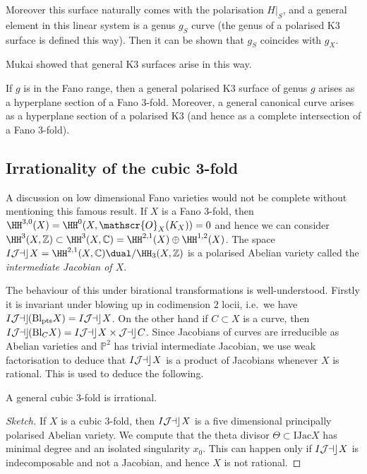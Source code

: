 Moreover this surface naturally comes with the polarisation \(H|_S\), and a general element in this linear system is a genus \(g_S\) curve (the genus of a polarised K3 surface is defined this way). Then it can be shown that \(g_S\) coincides with \(g_X\).

Mukai showed that general K3 surfaces arise in this way.

\begin{theorem}[(Mukai)]
    If \(g\) is in the Fano range, then a general polarised K3 surface of genus
    \(g\) arises as a hyperplane section of a Fano 3-fold. Moreover, a general
    canonical curve arises as a hyperplane section of a polarised K3 (and hence
    as a complete intersection of a Fano 3-fold).
\end{theorem}

\subsection{Irrationality of the cubic 3-fold} A discussion on low dimensional
Fano varieties would not be complete without mentioning this famous result.
If \(X\) is a Fano 3-fold, then \(\HH^{3,0}(X)=\HH^0(X,\mathscr{O}_X(K_X))=0\)
and hence we can consider \(\HH^3(X,\mathbb{Z})\subset
\HH^3(X,\mathbb{C})=\HH^{2,1}(X)\oplus \HH^{1,2}(X)\). The space
\(\IJac X=\HH^{2,1}(X,\mathbb{C})\dual / \HH_3(X,\mathbb{Z})\) is a
polarised Abelian variety called the \textit{intermediate Jacobian of \(X\)}.

The behaviour of this under birational transformations is well-understood.
Firstly it is invariant under blowing up in codimension \(2\) locii, i.e.\ we
have \(\mathop{I\mathcal{J\kern -0.5pt a\kern -0.5pt c\kern -1pt}}(\text{Bl}_{\text{pts}}X)=\mathop{I\mathcal{J\kern -0.5pt a\kern -0.5pt c\kern -1pt}} X\). On the other hand if
\(C\subset X\) is a curve, then \(\mathop{I\mathcal{J\kern -0.5pt a\kern -0.5pt c\kern -1pt}}(\text{Bl}_CX)=\mathop{I\mathcal{J\kern -0.5pt a\kern -0.5pt c\kern -1pt}} X\times
\mathop{\mathcal{J\kern -0.5pt a\kern -0.5pt c\kern -1pt}} C\). Since Jacobians of curves are irreducible as Abelian varieties and
\(\mathbb{P}^2\) has trivial intermediate Jacobian, we use weak factorisation to
deduce that \(\mathop{I\mathcal{J\kern -0.5pt a\kern -0.5pt c\kern -1pt}} X\) is a product of Jacobians whenever \(X\) is rational.
This is used to deduce the following.

\begin{theorem}
    A general cubic 3-fold is irrational.

    \begin{proof}[Sketch]
        If \(X\) is a cubic 3-fold, then \(\mathop{I\mathcal{J\kern -0.5pt a\kern -0.5pt c\kern -1pt}} X\) is a five dimensional
        principally polarised Abelian variety. We compute that the theta divisor
        \(\Theta\subset \text{IJac}X\) has minimal degree and an isolated
        singularity \(x_0\). This can happen only if \(\mathop{I\mathcal{J\kern -0.5pt a\kern -0.5pt c\kern -1pt}} X\) is
        indecomposable and not a Jacobian, and hence \(X\) is not rational.
    \end{proof}
\end{theorem}

